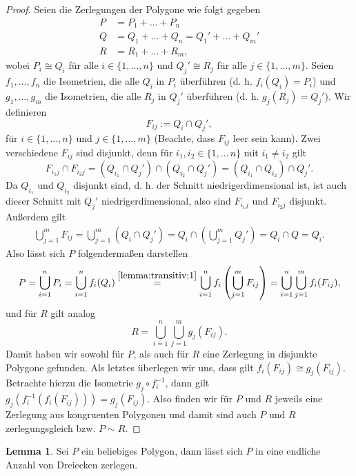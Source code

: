 \documentclass[11pt,titlepage]{article}
\theoremstyle{definition}
\newtheorem{lemma}[theorem]{Lemma}
\theoremstyle{remark}
\begin{document}
	\begin{proof}
		Seien die Zerlegungen der Polygone wie folgt gegeben
		\begin{align*}
			P &= P_1+\ldots+P_n \\
			Q &= Q_1+\ldots+Q_n = Q_1'+\ldots+Q_m' \\
			R &= R_1+\ldots+R_m,
		\end{align*}
		wobei $P_i\cong Q_i$ für alle $i\in\{1,\ldots,n\}$ und $Q_j'\cong R_j$ für alle $j\in\{1,\ldots,m\}$. 
		Seien $f_1,\ldots,f_n$ die Isometrien, die alle $Q_i$ in $P_i$ überführen (d. h. $f_i(Q_i)=P_i$) und 
		$g_1,\ldots,g_m$ die Isometrien, die alle $R_j$ in $Q_j'$ überführen (d. h. $g_j(R_j)=Q_j'$).
		Wir definieren
		\[ F_{ij}:=Q_i\cap Q_j',\]
		für $i\in\{1,\ldots,n\}$ und $j\in\{1,\ldots,m\}$ (Beachte, dass $F_{ij}$ leer sein kann). Zwei verschiedene 
		$F_{ij}$ sind disjunkt, denn für $i_1,i_2\in\{1,\ldots\,n\}$ mit $i_1\neq i_2$ gilt 
		\[F_{i_1 j}\cap F_{i_2 j}=(Q_{i_1}\cap Q_j')\cap(Q_{i_2}\cap Q_j')=(Q_{i_1}\cap Q_{i_2})\cap Q_j'.\] 
		Da $Q_{i_1}$ und $Q_{i_2}$ disjunkt sind, d. h. der Schnitt niedrigerdimensional ist, ist 
		auch dieser Schnitt mit $Q_j'$ niedrigerdimensional, also sind $F_{i_1j}$ und $F_{i_2j}$ disjunkt. Außerdem gilt
		\begin{align}
			\bigcup_{j=1}^m F_{ij} = \bigcup_{j=1}^m \left( Q_i \cap Q_j' \right) = 
			Q_i \cap \left( \bigcup_{j=1}^m Q_j' \right)=Q_i \cap Q = Q_i. \label{lemma:transitiv;1}
		\end{align}
		Also lässt sich $P$ folgendermaßen darstellen
		\[ P=\bigcup_{i=1}^n P_i = \bigcup_{i=1}^n f_i(Q_i) \overset{\ref{lemma:transitiv;1}}{=}\bigcup_{i=1}^n f_i 
		\left(\bigcup_{j=1}^m F_{ij} \right) =
		\bigcup_{i=1}^n \bigcup_{j=1}^m f_i(F_{ij}), \]
		und für $R$ gilt analog
		\[ R=\bigcup_{i=1}^n \bigcup_{j=1}^m g_j(F_{ij}). \]
		Damit haben wir sowohl für $P$, als auch für $R$ eine Zerlegung in disjunkte Polygone 
		gefunden. Als letztes überlegen wir uns, dass gilt $f_i(F_{ij})\cong g_j(F_{ij})$. Betrachte hierzu die Isometrie 
		$g_j\circ f_i^{-1}$, dann gilt $g_j(f_i^{-1}(f_i(F_{ij})))=g_j(F_{ij})$. Also finden wir für $P$ und $R$ jeweils eine 
		Zerlegung aus kongruenten Polygonen und damit sind auch $P$ und $R$ zerlegungsgleich bzw. $P\sim R$.
	\end{proof}
	
	\begin{lemma}
		Sei $P$ ein beliebiges Polygon, dann lässt sich $P$ in eine endliche Anzahl von Dreiecken zerlegen.
	\end{lemma}
	
\end{document}
